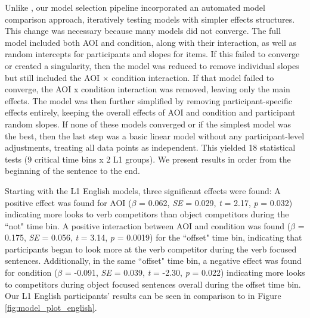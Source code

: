Unlike \cite{Ge2021}, our model selection pipeline incorporated an automated model comparison approach, iteratively testing models with simpler effects structures. This change was necessary because many models did not converge. The full model included both AOI and condition, along with their interaction, as well as random intercepts for participants and slopes for items. If this failed to converge or created a singularity, then the model was reduced to remove individual slopes but still included the AOI × condition interaction. If that model failed to converge, the AOI x condition interaction was removed, leaving only the main effects. The model was then further simplified by removing participant-specific effects entirely, keeping the overall effects of AOI and condition and participant random slopes. If none of these models converged or if the simplest model was the best, then the last step was a basic linear model without any participant-level adjustments, treating all data points as independent. This yielded 18 statistical tests (9 critical time bins x 2 L1 groups). We present results in order from the beginning of the sentence to the end. 

Starting with the L1 English models, three significant effects were found: A positive effect was found for AOI ($\beta$ = 0.062, \textit{SE} = 0.029, \textit{t} = 2.17, \textit{p} = 0.032) indicating more looks to verb competitors than object competitors during the ``not" time bin. A positive interaction between AOI and condition was found ($\beta$ = 0.175, \textit{SE} = 0.056, \textit{t} = 3.14, \textit{p} = 0.0019) for the ``offset" time bin, indicating that participants began to look more at the verb competitor during the verb focused sentences. Additionally, in the same ``offset" time bin, a negative effect was found for condition ($\beta$ = -0.091, \textit{SE} = 0.039, \textit{t} = -2.30, \textit{p} = 0.022) indicating more looks to competitors during object focused sentences overall during the offset time bin. Our L1 English participants' results can be seen in comparison to \cite{Ge2021} in Figure \ref{fig:model_plot_english}.

